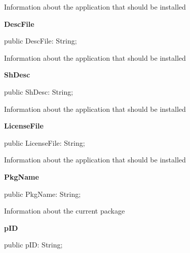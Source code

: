 \documentclass{report}
\newif\ifpdf
\begin{document}
\begin{list}{}
\begin{flushleft}
\ifpdf
\end{flushleft}
\fi


\par Information about the application that should be installed\label{mainunit.TIWizFrm-DescFile}
\item[\textbf{DescFile}\hfill]
\ifpdf
\begin{flushleft}
\fi
\begin{ttfamily}
public DescFile: String;\end{ttfamily}

\ifpdf
\end{flushleft}
\fi


\par Information about the application that should be installed\label{mainunit.TIWizFrm-ShDesc}
\item[\textbf{ShDesc}\hfill]
\ifpdf
\begin{flushleft}
\fi
\begin{ttfamily}
public ShDesc: String;\end{ttfamily}

\ifpdf
\end{flushleft}
\fi


\par Information about the application that should be installed\label{mainunit.TIWizFrm-LicenseFile}
\item[\textbf{LicenseFile}\hfill]
\ifpdf
\begin{flushleft}
\fi
\begin{ttfamily}
public LicenseFile: String;\end{ttfamily}

\ifpdf
\end{flushleft}
\fi


\par Information about the application that should be installed\label{mainunit.TIWizFrm-PkgName}
\item[\textbf{PkgName}\hfill]
\ifpdf
\begin{flushleft}
\fi
\begin{ttfamily}
public PkgName: String;\end{ttfamily}

\ifpdf
\end{flushleft}
\fi


\par Information about the current package\label{mainunit.TIWizFrm-pID}
\item[\textbf{pID}\hfill]
\ifpdf
\begin{flushleft}
\fi
\begin{ttfamily}
public pID: String;\end{ttfamily}


\end{flushleft}
\end{list}
\end{document}
